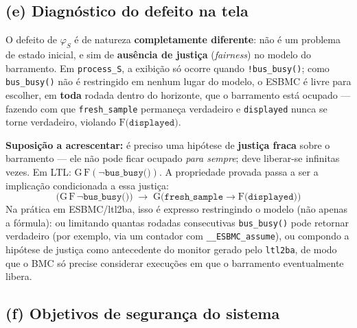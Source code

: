 \documentclass[12pt,a4paper]{article}
\newcommand{\LG}[1]{\mathrm{G}\bigl(#1\bigr)}
\newcommand{\LF}[1]{\mathrm{F}\bigl(#1\bigr)}
\newcommand{\vv}[1]{\texttt{#1}}
\begin{document}
\subsection{(e) Diagn\'ostico do defeito na tela}

O defeito de $\varphi_S$ \'e de natureza \textbf{completamente diferente}: n\~ao \'e um
problema de estado inicial, e sim de \textbf{aus\^encia de justi\c{c}a}
(\emph{fairness}) no modelo do barramento. Em \vv{process\_S}, a exibi\c{c}\~ao s\'o
ocorre quando \texttt{!bus\_busy()}; como \vv{bus\_busy()} n\~ao \'e restringido em
nenhum lugar do modelo, o ESBMC \'e livre para escolher, em \textbf{toda} rodada dentro do
horizonte, que o barramento est\'a ocupado --- fazendo com que \vv{fresh\_sample}
permane\c{c}a verdadeiro e \vv{displayed} nunca se torne verdadeiro, violando
$\LF{\vv{displayed}}$.

\begin{tcolorbox}[notabox]
\textbf{Suposi\c{c}\~ao a acrescentar:} \'e preciso uma hip\'otese de \textbf{justi\c{c}a
fraca} sobre o barramento --- ele n\~ao pode ficar ocupado \emph{para sempre}; deve
liberar-se infinitas vezes. Em LTL: $\mathrm{G}\,\mathrm{F}(\neg\texttt{bus\_busy()})$.
A propriedade provada passa a ser a implica\c{c}\~ao condicionada a essa justi\c{c}a:
\[
  \bigl(\mathrm{G}\,\mathrm{F}\,\neg\texttt{bus\_busy()}\bigr) \;\longrightarrow\;
  \LG{\vv{fresh\_sample} \rightarrow \LF{\vv{displayed}}}
\]
Na pr\'atica em ESBMC/ltl2ba, isso \'e expresso restringindo o modelo (n\~ao apenas a
f\'ormula): ou limitando quantas rodadas consecutivas \vv{bus\_busy()} pode retornar
verdadeiro (por exemplo, via um contador com \texttt{\_\_ESBMC\_assume}), ou compondo a
hip\'otese de justi\c{c}a como antecedente do monitor gerado pelo \texttt{ltl2ba}, de modo
que o BMC s\'o precise considerar execu\c{c}\~oes em que o barramento eventualmente libera.
\end{tcolorbox}

\subsection{(f) Objetivos de seguran\c{c}a do sistema}
\end{document}
